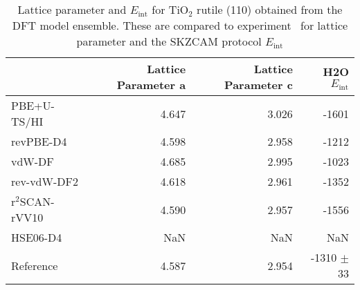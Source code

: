 \begin{table}
\caption{\label{tab:lattice_parametersr-tio2}Lattice parameter and  $E_\textrm{int}$ for TiO$_2$ rutile (110) obtained from the DFT model ensemble. These are compared to experiment~\cite{burdettStructuralelectronicRelationshipsInorganic1987} for lattice parameter and the SKZCAM protocol $E_\textrm{int}$}
\begin{tabular}{lrrr}
\toprule
 & Lattice Parameter a & Lattice Parameter c & H2O $E_\textrm{int}$ \\ 
\midrule
PBE+U-TS/HI & 4.647 & 3.026 & -1601 \\
revPBE-D4 & 4.598 & 2.958 & -1212 \\
vdW-DF & 4.685 & 2.995 & -1023 \\
rev-vdW-DF2 & 4.618 & 2.961 & -1352 \\
r$^2$SCAN-rVV10 & 4.590 & 2.957 & -1556 \\
HSE06-D4 & NaN & NaN & NaN \\
Reference & 4.587 & 2.954 & -1310 $\pm$ 33 \\
\bottomrule
\end{tabular}
\end{table}